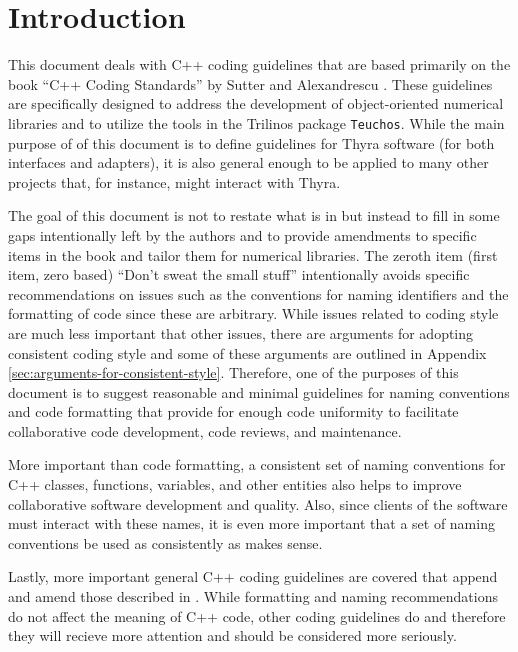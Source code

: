 %
\section{Introduction}
%

This document deals with C++ coding guidelines that are based primarily on the
book ``C++ Coding Standards'' by Sutter and Alexandrescu
{}\cite{C++CodingStandards05}.  These guidelines are specifically designed to
address the development of object-oriented numerical libraries and to utilize
the tools in the Trilinos package {}\texttt{Teuchos}.  While the main purpose
of of this document is to define guidelines for Thyra software (for both
interfaces and adapters), it is also general enough to be applied to many
other projects that, for instance, might interact with Thyra.

The goal of this document is not to restate what is in
{}\cite{C++CodingStandards05} but instead to fill in some gaps intentionally
left by the authors and to provide amendments to specific items in the book
and tailor them for numerical libraries.  The zeroth item (first item, zero
based) ``Don't sweat the small stuff'' intentionally avoids specific
recommendations on issues such as the conventions for naming identifiers and
the formatting of code since these are arbitrary.  While issues related to
coding style are much less important that other issues, there are arguments
for adopting consistent coding style and some of these arguments are outlined
in Appendix {}\ref{sec:arguments-for-consistent-style}.  Therefore, one of the
purposes of this document is to suggest reasonable and minimal guidelines for
naming conventions and code formatting that provide for enough code uniformity
to facilitate collaborative code development, code reviews, and maintenance.

More important than code formatting, a consistent set of naming conventions
for C++ classes, functions, variables, and other entities also helps to
improve collaborative software development and quality.  Also, since clients
of the software must interact with these names, it is even more important that
a set of naming conventions be used as consistently as makes sense.

Lastly, more important general C++ coding guidelines are covered that append
and amend those described in {}\cite{C++CodingStandards05}.  While formatting
and naming recommendations do not affect the meaning of C++ code, other coding
guidelines do and therefore they will recieve more attention and should be
considered more seriously.

